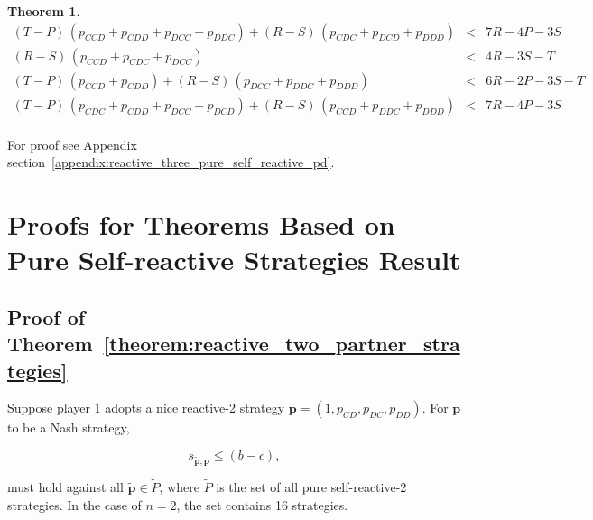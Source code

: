 \documentclass{article}
\theoremstyle{definition}
\newtheorem{theorem}{Theorem}[section]
\begin{document}
\begin{theorem}
\begin{equation*}
\begin{array}{ccc}
    (T - P)\,(p_{CCD} + p_{CDD} + p_{DCC} + p_{DDC}) + (R - S)\,(p_{CDC} + p_{DCD} + p_{DDD}) & < & 7 R - 4 P - 3 S \\ [0.2cm]
    (R - S)\,(p_{CCD} + p_{CDC} + p_{DCC}) & < & 4 R - 3 S - T \\ [0.2cm]
    (T - P)\,(p_{CCD} + p_{CDD}) + (R - S)\,(p_{DCC} + p_{DDC} + p_{DDD}) & < & 6 R - 2 P - 3 S - T \\ [0.2cm]
    (T - P)\,(p_{CDC} + p_{CDD} + p_{DCC} + p_{DCD}) + (R - S)\,(p_{CCD} + p_{DDC} + p_{DDD}) & < & 7 R - 4 P - 3 S \\ [0.2cm]
    \end{array}
\end{equation*}
\end{theorem}

For proof see Appendix section~\ref{appendix:reactive_three_pure_self_reactive_pd}.

\appendix


\section{Proofs for Theorems Based on Pure Self-reactive Strategies Result}\label{appendix:proofs_for_theorems_pure_self_reactive}


\subsection{Proof of Theorem~\ref{theorem:reactive_two_partner_strategies}}\label{appendix:reactive_two_pure_self_reactive}

Suppose player $1$ adopts a nice reactive-2 strategy
$\mathbf{p}\!=\!(1, p_{CD}, p_{DC}, p_{DD})$. For $\mathbf{p}$ to be a Nash
strategy,

\begin{equation*}
  s_{\mathbf{\tilde{p}}, \mathbf{p}} \leq (b - c),
\end{equation*}

must hold against all \(\mathbf{\tilde{p}} \in \tilde{P}\), where \(\tilde{P}\) is the
set of all pure self-reactive-2 strategies. In the case of $n=2$, the set
contains 16 strategies.
\end{document}
